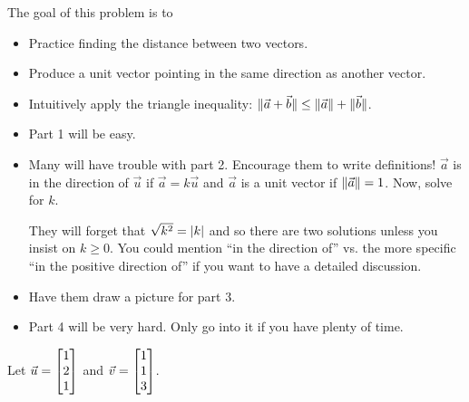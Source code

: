 \documentclass{problemset}
\begin{document}


	\question
	\begin{annotation}
		\begin{goals}

			The goal of this problem is to
			\begin{itemize}
				\item Practice finding the distance between two vectors.
				\item Produce a unit vector pointing in the same direction as another vector.
				\item Intuitively apply the triangle inequality: $\lVert\vec a+\vec b\rVert\leq \lVert\vec a\rVert+\lVert\vec b\rVert$.
			\end{itemize}
		\end{goals}

		\begin{notes}
			\begin{itemize}
				\item Part 1 will be easy.
				\item Many will have trouble with part 2. Encourage them to write definitions! $\vec a$ is
					in the direction of $\vec u$ if $\vec a=k\vec u$ and $\vec a$ is a unit vector if $\lVert\vec a\rVert=1$.
					Now, solve for $k$.

					They will forget that $\sqrt{k^2}=\lvert k\rvert$ and so there are two solutions
					unless you insist on $k\geq 0$. You could mention ``in the direction of'' vs. the
					more specific ``in the positive direction of'' if you want to have a detailed discussion.
				\item Have them draw a picture for part 3.
				\item Part 4 will be very hard. Only go into it if you have plenty of time.
			\end{itemize}
		\end{notes}
	\end{annotation}
	Let $\vec u=\mat{1\\2\\1}$ and $\vec v=\mat{1\\1\\3}$.
\end{document}
